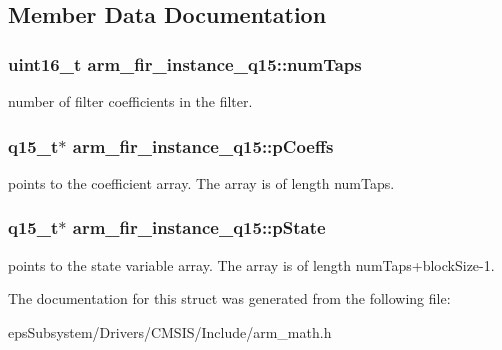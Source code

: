 \subsection{Member Data Documentation}
\hypertarget{structarm__fir__instance__q15_a0e46f93cf51bfb18b1be808be9c5bfc9}{
\subsubsection[{num\-Taps}]{\setlength{\rightskip}{0pt plus 5cm}uint16\-\_\-t arm\-\_\-fir\-\_\-instance\-\_\-q15\-::num\-Taps}}\label{structarm__fir__instance__q15_a0e46f93cf51bfb18b1be808be9c5bfc9}
number of filter coefficients in the filter. \hypertarget{structarm__fir__instance__q15_a6d16db16a5f8f0db54938f2967244d9e}{
\subsubsection[{p\-Coeffs}]{\setlength{\rightskip}{0pt plus 5cm}q15\-\_\-t$\ast$ arm\-\_\-fir\-\_\-instance\-\_\-q15\-::p\-Coeffs}}\label{structarm__fir__instance__q15_a6d16db16a5f8f0db54938f2967244d9e}
points to the coefficient array. The array is of length num\-Taps. \hypertarget{structarm__fir__instance__q15_aa8d25f44f45b6a6c4cf38c31569b8a01}{
\subsubsection[{p\-State}]{\setlength{\rightskip}{0pt plus 5cm}q15\-\_\-t$\ast$ arm\-\_\-fir\-\_\-instance\-\_\-q15\-::p\-State}}\label{structarm__fir__instance__q15_aa8d25f44f45b6a6c4cf38c31569b8a01}
points to the state variable array. The array is of length num\-Taps+block\-Size-\/1. 

The documentation for this struct was generated from the following file\-:\begin{DoxyCompactItemize}
\item 
eps\-Subsystem/\-Drivers/\-C\-M\-S\-I\-S/\-Include/arm\-\_\-math.\-h\end{DoxyCompactItemize}
